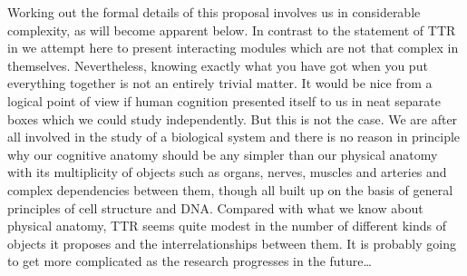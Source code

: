 Working out the formal details of this proposal involves us in
considerable complexity, as will become apparent below.  In contrast
to the statement of TTR in \cite{Cooper2005} we attempt here to
present interacting modules which are not that complex in themselves.
Nevertheless, knowing exactly what you have got when you put
everything together is not an entirely trivial matter.  It would be
nice from a logical point of view if human cognition presented itself
to us in neat separate boxes which we could study independently.  But
this is not the case.  We
are after all involved in the study of a biological system and there
is no reason in principle why our cognitive anatomy should be any
simpler than our physical anatomy with its multiplicity of objects
such as organs, nerves, muscles and arteries and complex dependencies
between them, though all built up on the basis of general principles
of cell structure and DNA.  Compared with what we know about physical
anatomy,  TTR seems quite modest in the number of different kinds of
objects it proposes and the interrelationships between them.  It is
probably going to get more complicated as the research progresses in
the future\ldots
